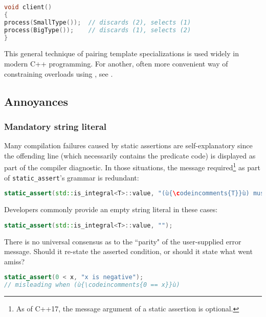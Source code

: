 \begin{lstlisting}[language=C++]
void client()
{
process(SmallType());  // discards (2), selects (1)
process(BigType());    // discards (1), selects (2)
}
\end{lstlisting}

\noindent This general technique of pairing template specializations is used widely
in modern C++ programming. For another, often more convenient way of
constraining overloads using , see
.

\subsection[Annoyances]{Annoyances}\label{static-annoyances}

\subsubsection[Mandatory string literal]{Mandatory string literal}\label{mandatory-string-literal}

Many compilation failures caused by static assertions are
self-explanatory since the offending line (which necessarily contains the
predicate code) is displayed as part of the compiler diagnostic. In
those situations, the message required{\cprotect\footnote{As of C++17,
the message argument of a static assertion is optional.}} as part of
\lstinline!static_assert!'s grammar is redundant:

\begin{lstlisting}[language=C++]
static_assert(std::is_integral<T>::value, "(ù{\codeincomments{T}}ù) must be an integral type.");
\end{lstlisting}

\noindent Developers commonly provide an empty string literal in these
cases:

\begin{lstlisting}[language=C++]
static_assert(std::is_integral<T>::value, "");
\end{lstlisting}

There is no universal consensus as to the ``parity" of the user-supplied error message.  Should it re-state the asserted condition, or should it state what went amiss?
\begin{lstlisting}[language=C++]
static_assert(0 < x, "x is negative");
// misleading when (ù{\codeincomments{0 == x}}ù)
\end{lstlisting}

